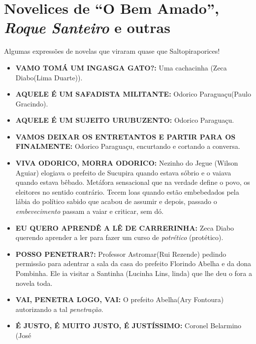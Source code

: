 \documentclass[12pt,brazil,]{book}
\providecommand{\tightlist}{%
  \setlength{\itemsep}{0pt}\setlength{\parskip}{0pt}}
\begin{document}
\section{\texorpdfstring{Novelices de ``O Bem Amado'', \emph{Roque
Santeiro} e
outras}{Novelices de O Bem Amado, Roque Santeiro e outras}}\label{novelices-de-o-bem-amado-roque-santeiro-e-outras}

Algumas expressões de novelas que viraram quase que Saltopiraporices!

\begin{itemize}
\tightlist
\item
  \textbf{VAMO TOMÁ UM INGASGA GATO?:} Uma cachacinha (Zeca Diabo(Lima
  Duarte)).\\
\item
  \textbf{AQUELE É UM SAFADISTA MILITANTE:} Odorico Paraguaçu(Paulo
  Gracindo).\\
\item
  \textbf{AQUELE É UM SUJEITO URUBUZENTO:} Odorico Paraguaçu.\\
\item
  \textbf{VAMOS DEIXAR OS ENTRETANTOS E PARTIR PARA OS FINALMENTE:}
  Odorico Paraguaçu, encurtando e cortando a conversa.\\
\item
  \textbf{VIVA ODORICO, MORRA ODORICO:} Nezinho do Jegue (Wilson Aguiar)
  elogiava o prefeito de Sucupira quando estava sóbrio e o vaiava quando
  estava bêbado. Metáfora sensacional que na verdade define o povo, os
  eleitores no sentido contrário. Tecem loas quando estão embebedados
  pela lábia do político sabido que acabou de assumir e depois, passado
  o \emph{embevecimento} passam a vaiar e criticar, sem dó.\\
\item
  \textbf{EU QUERO APRENDÊ A LÊ DE CARRERINHA:} Zeca Diabo querendo
  aprender a ler para fazer um curso de \emph{potrético} (protético).\\
\item
  \textbf{POSSO PENETRAR?:} Professor Astromar(Rui Rezende) pedindo
  permissão para adentrar a sala da casa do prefeito Florindo Abelha e
  da dona Pombinha. Ele ia visitar a Santinha (Lucinha Lins, linda) que
  lhe deu o fora a novela toda.\\
\item
  \textbf{VAI, PENETRA LOGO, VAI:} O prefeito Abelha(Ary Fontoura)
  autorizando a tal \emph{penetração}.\\
\item
  \textbf{É JUSTO, É MUITO JUSTO, É JUSTÍSSIMO:} Coronel Belarmino (José

\end{itemize}
\end{document}
